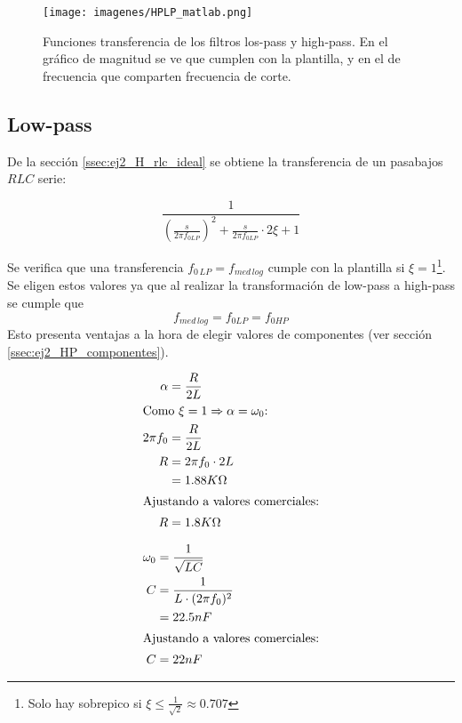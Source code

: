 \begin{figure*}	%
	\texttt{[image: imagenes/HPLP\_matlab.png]}
	\caption[Funciones transferencia de los filtros low-pass y high-pass]{Funciones transferencia de los filtros los-pass y high-pass. En el gr\'afico de magnitud se ve que cumplen con la plantilla, y en el de frecuencia que comparten frecuencia de corte.}
	\label{fig:ej2_HPLP_tf}
\end{figure*}


 



\subsection{Low-pass}

De la secci\'on \ref{ssec:ej2_H_rlc_ideal} se obtiene la transferencia de un pasabajos $RLC$ serie:

	\begin{equation}
	\frac{1}{\left(\frac{s}{2\pi f_{0LP}}\right)^2 + \frac{s}{2\pi f_{0LP}} \cdot 2\xi + 1}
	\label{eq:ej2_LP_tf_syms}
	\end{equation}	
	

Se verifica que una transferencia $f_{0\,LP}=f_{med\, log}$ cumple con la plantilla si $\xi = 1$\footnote{Solo hay sobrepico si $\xi\leqslant \frac{1}{\sqrt{2}}\approx 0.707$}. Se eligen estos valores ya que al realizar la transformaci\'on de low-pass a high-pass se cumple que 
\begin{equation}
	f_{med\, log} = f_{0LP} = f_{0HP}
	\label{eq:ej2_f0_LP_HP}
\end{equation} 
Esto presenta ventajas a la hora de elegir valores de componentes (ver secci\'on \ref{ssec:ej2_HP_componentes}).


\begin{align}	%
	\alpha &= \frac{R}{2L}	\\
	\intertext{Como $\xi = 1 \Rightarrow \alpha = \omega _0$:}
	2\pi f_0 &= \frac{R}{2L}\\ 
	R &= 2\pi f_0 \cdot 2L 	\\
	&= 1.88K\Omega			\\
	\intertext{Ajustando a valores comerciales:}
	R &= 1.8K\Omega
\end{align}

\begin{align}	%
	\omega_0 &= \frac{1}{\sqrt{LC}}		\\
	C &= \frac{1}{L\cdot (2\pi f_0)^2}	\\
	&= 22.5nF 							\\
	\intertext{Ajustando a valores comerciales:}
	C&=22nF
\end{align}

